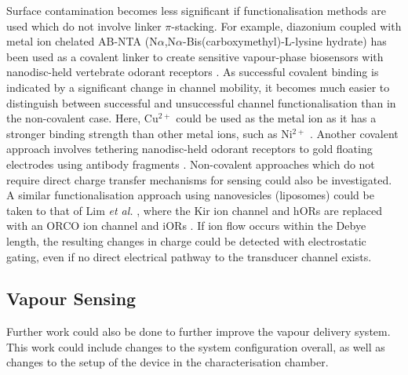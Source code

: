 \documentclass[
  a4paper,
]{scrbook}
\begin{document}
Surface contamination becomes less significant if functionalisation
methods are used which do not involve linker \(\pi\)-stacking. For
example, diazonium coupled with metal ion chelated AB-NTA
(N\(\alpha\),N\(\alpha\)-Bis(carboxymethyl)-L-lysine hydrate) has been
used as a covalent linker to create sensitive vapour-phase biosensors
with nanodisc-held vertebrate odorant receptors
\autocite{Goldsmith2011}. As successful covalent binding is indicated by
a significant change in channel mobility, it becomes much easier to
distinguish between successful and unsuccessful channel
functionalisation than in the non-covalent case. Here, Cu\(^{2+}\) could
be used as the metal ion as it has a stronger binding strength than
other metal ions, such as Ni\(^{2+}\)
\autocite{Chang2017,Aravinda2009,Baur2010}. Another covalent approach
involves tethering nanodisc-held odorant receptors to gold floating
electrodes using antibody fragments
\autocite{Yang2017,Yang2018,Lee2018}. Non-covalent approaches which do
not require direct charge transfer mechanisms for sensing could also be
investigated. A similar functionalisation approach using nanovesicles
(liposomes) could be taken to that of Lim \emph{et al.}
\autocite{Lim2015}, where the Kir ion channel and hORs are replaced with
an ORCO ion channel and iORs \autocite{Wicher2021}. If ion flow occurs
within the Debye length, the resulting changes in charge could be
detected with electrostatic gating, even if no direct electrical pathway
to the transducer channel exists.

\hypertarget{sec-future-work-vapour}{%
\subsection{Vapour Sensing}\label{sec-future-work-vapour}}

Further work could also be done to further improve the vapour delivery
system. This work could include changes to the system configuration
overall, as well as changes to the setup of the device in the
characterisation chamber.
\end{document}
